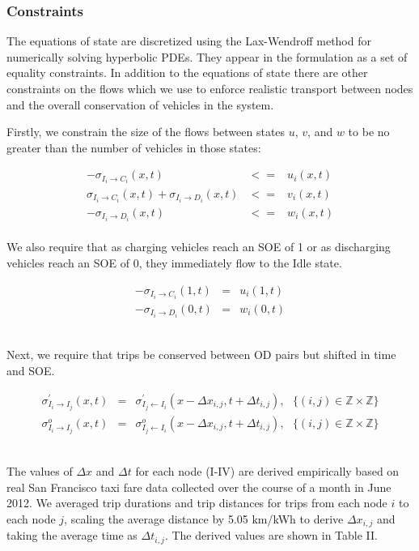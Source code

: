 \documentclass[journal]{IEEEtran}
\begin{document}
\subsubsection{Constraints}

The equations of state are discretized using the Lax-Wendroff method for numerically solving hyperbolic PDEs. They appear in the formulation as a set of equality constraints. In addition to the equations of state there are other constraints on the flows which we use to enforce realistic transport between nodes and the overall conservation of vehicles in the system. 

Firstly, we constrain the size of the flows between states $u$, $v$, and $w$ to be no greater than the number of vehicles in those states:

\begin{eqnarray*}
    -\sigma_{I_i \rightarrow C_i}(x,t) & <= & u_i(x,t) \\
    \sigma_{I_i \rightarrow C_i}(x,t) + \sigma_{I_i \rightarrow D_i}(x,t) & <= & v_i(x,t) \\
    -\sigma_{I_i \rightarrow D_i}(x,t) & <= & w_i(x,t) 
\end{eqnarray*}
~\\ 
We also require that as charging vehicles reach an SOE of 1 or as discharging vehicles reach an SOE of 0, they immediately flow to the Idle state.

\begin{eqnarray*}
    -\sigma_{I_i \rightarrow C_i}(1,t) & = & u_i(1,t) \\
    -\sigma_{I_i \rightarrow D_i}(0,t) & = & w_i(0,t) 
\end{eqnarray*}

~\\ 
Next, we require that trips be conserved between OD pairs but shifted in time and SOE.

\begin{eqnarray*}
    \sigma_{I_i \rightarrow I_j}^\prime(x,t) & = & \sigma_{I_j \leftarrow I_i}^\prime(x - \Delta x_{i,j},t + \Delta t_{i,j}), ~~~ \{(i,j) \in \mathbb{Z} \times \mathbb{Z}\} \\
     \sigma_{I_i \rightarrow I_j}^o(x,t) & = & \sigma_{I_j \leftarrow I_i}^o(x - \Delta x_{i,j},t + \Delta t_{i,j}), ~~~ \{(i,j) \in \mathbb{Z} \times \mathbb{Z}\}
\end{eqnarray*}

~\\ 
The values of $\Delta x$ and $\Delta t$ for each node (I-IV) are derived empirically based on real San Francisco taxi fare data collected over the course of a month in June 2012. We averaged trip durations and trip distances for trips from each node $i$ to each node $j$,  scaling the average distance by 5.05 km/kWh to derive $\Delta x_{i,j}$ and taking the average time as $\Delta t_{i,j}$. The derived values are shown in Table II.
\end{document}
